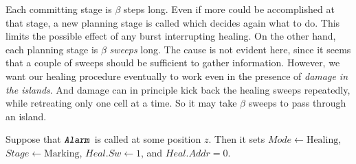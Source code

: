 \documentclass[12pt]{memoir}
\newcommand{\fld}[1]{\ensuremath{\textit{#1}}}
\newcommand{\rul}[1]{\ensuremath{\texttt{\slshape #1\/}}}
\newcommand{\z}{z}
\newcommand{\Addr}{\fld{Addr}}
\newcommand{\Mode}{\fld{Mode}}
\newcommand{\Heal}{\fld{Heal}}
\newcommand{\Stage}{\fld{Stage}}
\newcommand{\Sweep}{\fld{Sw}}
\newcommand{\Marking}{\mathrm{Marking}}
\newcommand{\Healing}{\mathrm{Healing}}
\newcommand{\Alarm}{\rul{Alarm}}
\begin{document}
Each committing stage is \( \beta \) steps long.
Even if more could be accomplished at that stage, a new planning stage
is called which decides again what to do.
This limits the possible effect of any burst interrupting healing.
On the other hand, each planning stage is \( \beta \) \emph{sweeps} long.
The cause is not evident here, since it seems  that a couple of sweeps should
be sufficient to gather information.
However, we want our healing procedure eventually to work even
in the presence of \emph{damage in the islands}.
And damage can in principle kick back the healing sweeps repeatedly, 
while retreating only one cell at a time.
So it may take \( \beta \) sweeps to pass through an island.

Suppose that \( \Alarm \) is called at some position \( \z \).
Then it sets  \( \Mode\gets\Healing \),  \( \Stage\gets\Marking \),
\( \Heal.\Sweep \gets 1 \), and \( \Heal.\Addr = 0 \).
\end{document}
